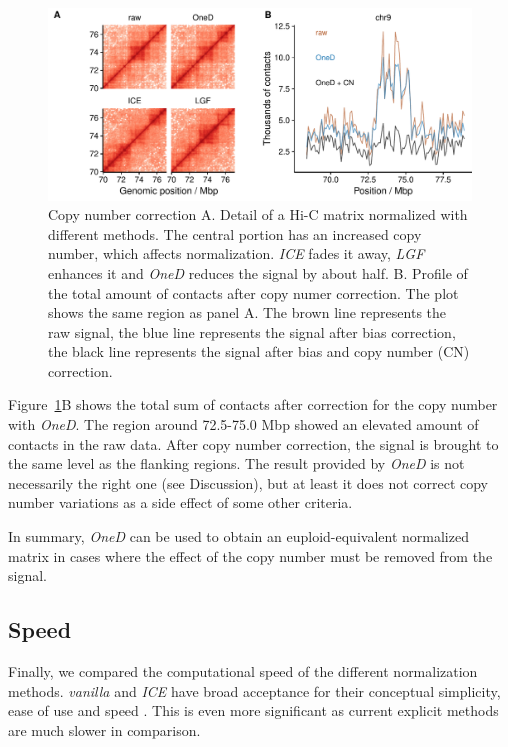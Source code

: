 \documentclass{article}
\begin{document}
\begin{figure}
\centerline{\includegraphics[width=.99\textwidth]
  {img/figure_cnv_correction.pdf}}
\caption{
Copy number correction A. Detail of a Hi-C matrix normalized with
different methods. The central portion has an increased copy number, which
affects normalization. \textit{ICE} fades it away, \textit{LGF} enhances
it and \textit{OneD} reduces the signal by about half. B. Profile of the
total amount of contacts after copy numer correction. The plot shows the
same region as panel A. The brown line represents the raw signal, the blue
line represents the signal after bias correction, the black line
represents the signal after bias and copy number (CN) correction.}
\label{fig:cnv_correction}
\end{figure}

Figure~\ref{fig:cnv_correction}B shows the total sum of contacts after
correction for the copy number with \textit{OneD}. The region around
72.5-75.0 Mbp showed an elevated amount of contacts in the raw data. After
copy number correction, the signal is brought to the same level as the
flanking regions. The result provided by \textit{OneD} is not necessarily
the right one (see Discussion), but at least it does not correct copy
number variations as a side effect of some other criteria.

In summary, \textit{OneD} can be used to obtain an euploid-equivalent
normalized matrix in cases where the effect of the copy number must be
removed from the signal.

\subsection{Speed}

Finally, we compared the computational speed of the different
normalization methods. \textit{vanilla} and \textit{ICE} have broad
acceptance for their conceptual simplicity, ease of use and speed
\citep{imakaev2012iterative}. This is even more significant as current
explicit methods \citep{servant2012hitc} are much slower in comparison.
\end{document}
